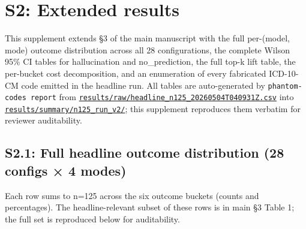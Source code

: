 \section{S2: Extended results}\label{s2-extended-results}

This supplement extends §3 of the main manuscript with the full
per-(model, mode) outcome distribution across all 28 configurations,
the complete Wilson 95\% CI tables for hallucination and
no\_prediction, the full top-k lift table, the per-bucket cost
decomposition, and an enumeration of every fabricated ICD-10-CM code
emitted in the headline run. All tables are auto-generated by
\texttt{phantom-codes\ report} from
\href{https://github.com/ufbfung/phantom-codes/blob/main/BENCHMARK.md}{\texttt{results/raw/headline\_n125\_20260504T040931Z.csv}}
into \href{https://github.com/ufbfung/phantom-codes/tree/main/results/summary/n125_run_v2/}{\texttt{results/summary/n125\_run\_v2/}};
this supplement reproduces them verbatim for reviewer auditability.

\subsection{S2.1: Full headline outcome distribution (28 configs × 4 modes)}\label{s2.1-full-headline-outcome-distribution-28-configs-4-modes}

Each row sums to n=125 across the six outcome buckets (counts and
percentages). The headline-relevant subset of these rows is in main
§3 Table 1; the full set is reproduced below for auditability.

